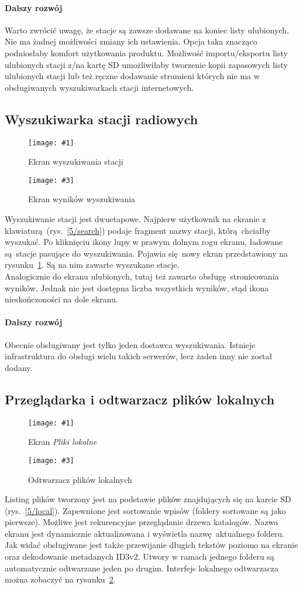 \documentclass[12pt]{report}
\newcommand{\imgintss}[5]{
	\begin{figure}[{#5}]
		\centering
		\begin{minipage}{.45\textwidth}
			\centering
			\texttt{[image: \#1]}
			\caption{#2}
			\label{#1}
		\end{minipage}%
		\hfill
		\begin{minipage}{.45\textwidth}
			\centering
			\texttt{[image: \#3]}
			\caption{#4}
			\label{#3}
		\end{minipage}
	\end{figure}
}
\newcommand{\imghss}[4]{\imgintss{#1}{#2}{#3}{#4}{H}}
\begin{document}
			\paragraph{Dalszy rozwój}
				Warto zwrócić uwagę, że stacje są zawsze dodawane na koniec listy ulubionych. Nie ma żadnej możliwości zmiany ich ustawienia. Opcja taka znacząco podniosłaby komfort użytkowania produktu. Możliwość importu/eksportu listy ulubionych stacji z/na kartę SD umożliwiłaby tworzenie kopii zapasowych listy ulubionych stacji lub też ręczne dodawanie strumieni których nie ma w obsługiwanych wyszukiwarkach stacji internetowych.
			
		\subsection{Wyszukiwarka stacji radiowych}
			\imghss{5/search}{Ekran wyszukiwania stacji}{5/searchres}{Ekran wyników wyszukiwania}
			Wyszukiwanie stacji jest dwuetapowe. Najpierw użytkownik na ekranie z klawiaturą (rys.~\ref{5/search}) podaje fragment nazwy stacji, którą chciałby wyszukać. Po kliknięciu ikony lupy w prawym dolnym rogu ekranu, ładowane są stacje pasujące do wyszukiwania. Pojawia się nowy ekran przedstawiony na rysunku~\ref{5/searchres}. Są na nim zawarte wyszukane stacje.
			$ $\\
			
			Analogicznie do ekranu ulubionych, tutaj też zawarto obsługę stronicowania wyników. Jednak nie jest dostępna liczba wszystkich wyników, stąd ikona nieskończoności na dole ekranu.
			
			\paragraph{Dalszy rozwój}
				Obecnie obsługiwany jest tylko jeden dostawca wyszukiwania. Istnieje infrastruktura do obsługi wielu takich serwerów, lecz żaden inny nie został dodany.
			
		\subsection{Przeglądarka i odtwarzacz plików lokalnych}
			\imghss{5/local}{Ekran \textit{Pliki lokalne}}{5/local_play}{Odtwarzacz plików lokalnych}
			Listing plików tworzony jest na podstawie plików znajdujących się na karcie SD (rys.~\ref{5/local}). Zapewnione jest sortowanie wpisów (foldery sortowane są jako pierwsze). Możliwe jest rekurencyjne przeglądanie drzewa katalogów. Nazwa ekranu jest dynamicznie aktualizowana i wyświetla nazwę aktualnego folderu. Jak widać obsługiwane jest także przewijanie długich tekstów poziomo na ekranie oraz dekodowanie metadanych ID3v2. Utwory w ramach jednego folderu są automatycznie odtwarzane jeden po drugim. Interfejs lokalnego odtwarzacza można zobaczyć na rysunku~\ref{5/local_play}.
			
\end{document}
